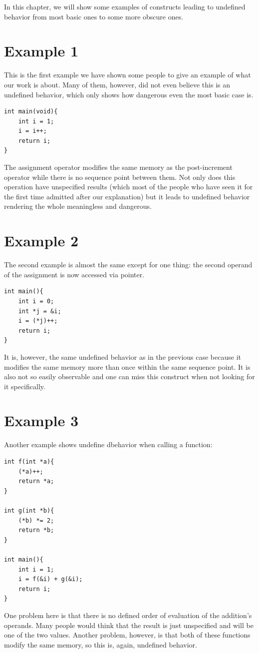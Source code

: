 In this chapter, we will show some examples of constructs leading to undefined behavior from most basic ones to some more obscure ones.

\section{Example 1}\label{example1}
This is the first example we have shown some people to give an example of what our work is about. Many of them, however, did not even believe this is an undefined behavior, which only shows how dangerous even the most basic case is.
\begin{lstlisting}
int main(void){
	int i = 1;
	i = i++;
	return i;
}
\end{lstlisting}
The assignment operator modifies the same memory as the post-increment operator while there is no sequence point between them. Not only does this operation have unspecified results (which most of the people who have seen it for the first time admitted after our explanation) but it leads to undefined behavior rendering the whole meaningless and dangerous.

\section{Example 2}\label{example2}
The second example is almost the same except for one thing: the second operand of the assignment is now accessed via pointer.
\begin{lstlisting}
int main(){
	int i = 0;
	int *j = &i;
	i = (*j)++;
    return i;
}
\end{lstlisting}\label{example2}
It is, however, the same undefined behavior as in the previous case because it modifies the same memory more than once within the same sequence point. It is also not so easily observable and one can miss this construct when not looking for it specifically.

\section{Example 3}\label{example3}
Another example shows undefine dbehavior when calling a function:
\begin{lstlisting}
int f(int *a){
    (*a)++;
    return *a;
}

int g(int *b){
    (*b) *= 2;
    return *b;
}

int main(){
    int i = 1;
    i = f(&i) + g(&i);
    return i;
}
\end{lstlisting}\label{example3}
One problem here is that there is no defined order of evaluation of the addition's operands. Many people would think that the result is just unspecified and will be one of the two values. Another problem, however, is that both of these functions modify the same memory, so this is, again, undefined behavior.

